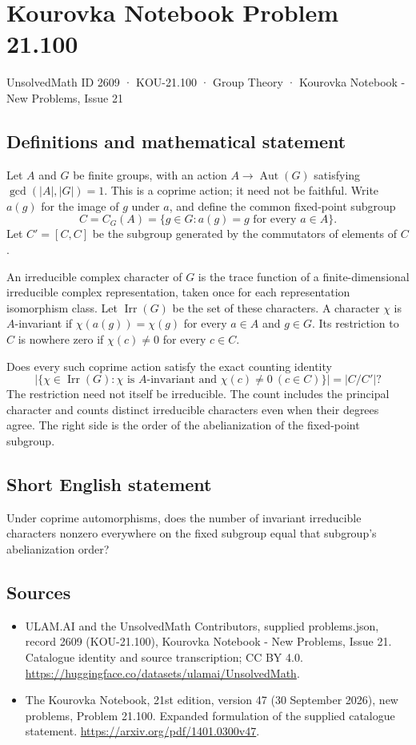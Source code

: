 \documentclass[11pt,a4paper]{article}
\begin{document}
\section*{Kourovka Notebook Problem 21.100}\label{2609}
{\small UnsolvedMath ID 2609 · KOU-21.100 · Group Theory · Kourovka Notebook - New Problems, Issue 21}
\subsection{Definitions and mathematical statement}
Let $A$ and $G$ be finite groups, with an action $A\to\operatorname{Aut}(G)$ satisfying $\gcd(|A|,|G|)=1$. This is a coprime action; it need not be faithful. Write $a(g)$ for the image of $g$ under $a$, and define the common fixed-point subgroup
\[
 C=C_G(A)=\{g\in G:a(g)=g\text{ for every }a\in A\}.
\]
Let $C'=[C,C]$ be the subgroup generated by the commutators of elements of $C$.

An irreducible complex character of $G$ is the trace function of a finite-dimensional irreducible complex representation, taken once for each representation isomorphism class. Let $\operatorname{Irr}(G)$ be the set of these characters. A character $\chi$ is $A$-invariant if $\chi(a(g))=\chi(g)$ for every $a\in A$ and $g\in G$. Its restriction to $C$ is nowhere zero if $\chi(c)\ne0$ for every $c\in C$.

Does every such coprime action satisfy the exact counting identity
\[
 \left|\{\chi\in\operatorname{Irr}(G):
 \chi\text{ is }A\text{-invariant and }\chi(c)\ne0\ (c\in C)\}\right|
 =|C/C'|?
\]
The restriction need not itself be irreducible. The count includes the principal character and counts distinct irreducible characters even when their degrees agree. The right side is the order of the abelianization of the fixed-point subgroup.
\subsection{Short English statement}
Under coprime automorphisms, does the number of invariant irreducible characters nonzero everywhere on the fixed subgroup equal that subgroup’s abelianization order?
\subsection{Sources}
\begin{itemize}
\item[S1] ULAM.AI and the UnsolvedMath Contributors, supplied problems.json, record 2609 (KOU-21.100), Kourovka Notebook - New Problems, Issue 21. Catalogue identity and source transcription; CC BY 4.0.
\url{https://huggingface.co/datasets/ulamai/UnsolvedMath}.
\item[S2] The Kourovka Notebook, 21st edition, version 47 (30 September 2026), new problems, Problem 21.100. Expanded formulation of the supplied catalogue statement.
\url{https://arxiv.org/pdf/1401.0300v47}.
\end{itemize}
\end{document}
